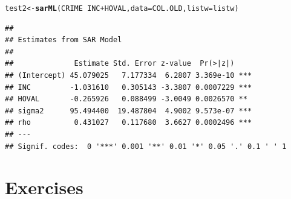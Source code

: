 \documentclass[english,12pt]{book}\usepackage[]{graphicx}\usepackage[]{xcolor}
\makeatletter
\newcommand{\hlopt}[1]{\textcolor[rgb]{0,0,0}{#1}}%
\newcommand{\hlstd}[1]{\textcolor[rgb]{0.345,0.345,0.345}{#1}}%
\newcommand{\hlkwb}[1]{\textcolor[rgb]{0.69,0.353,0.396}{#1}}%
\newcommand{\hlkwc}[1]{\textcolor[rgb]{0.333,0.667,0.333}{#1}}%
\newcommand{\hlkwd}[1]{\textcolor[rgb]{0.737,0.353,0.396}{\textbf{#1}}}%
\newenvironment{kframe}{%
 \def\at@end@of@kframe{}%
 \ifinner\ifhmode%
  \def\at@end@of@kframe{\end{minipage}}%
  \begin{minipage}{\columnwidth}%
 \fi\fi%
 \def\FrameCommand##1{\hskip\@totalleftmargin \hskip-\fboxsep
 \colorbox{shadecolor}{##1}\hskip-\fboxsep
     \hskip-\linewidth \hskip-\@totalleftmargin \hskip\columnwidth}%
 \MakeFramed {\advance\hsize-\width
   \@totalleftmargin\z@ \linewidth\hsize
   \@setminipage}}%
 {\par\unskip\endMakeFramed%
 \at@end@of@kframe}
\newenvironment{knitrout}{}{} %
\makeatother
\begin{document}
\begin{knitrout}
\color{fgcolor}\begin{kframe}
\begin{alltt}
\hlstd{test2} \hlkwb{<-} \hlkwd{sarML}\hlstd{(CRIME} \hlopt{~} \hlstd{INC} \hlopt{+} \hlstd{HOVAL,} \hlkwc{data} \hlstd{= COL.OLD,} \hlkwc{listw} \hlstd{= listw)}
\end{alltt}
\begin{verbatim}
## 
## Estimates from SAR Model 
## 
##              Estimate Std. Error z-value  Pr(>|z|)    
## (Intercept) 45.079025   7.177334  6.2807 3.369e-10 ***
## INC         -1.031610   0.305143 -3.3807 0.0007229 ***
## HOVAL       -0.265926   0.088499 -3.0049 0.0026570 ** 
## sigma2      95.494400  19.487804  4.9002 9.573e-07 ***
## rho          0.431027   0.117680  3.6627 0.0002496 ***
## ---
## Signif. codes:  0 '***' 0.001 '**' 0.01 '*' 0.05 '.' 0.1 ' ' 1
\end{verbatim}
\end{kframe}
\end{knitrout}


\section{Exercises}
\end{document}
